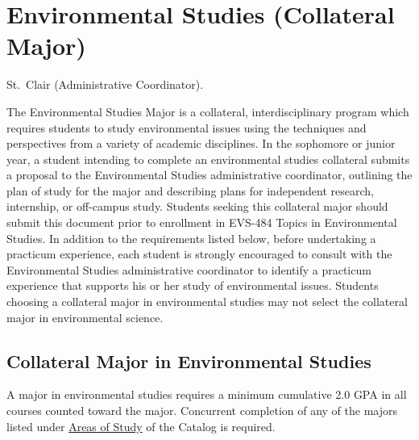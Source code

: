 \documentclass[
  letterpaper,
]{scrbook}
\begin{document}
\hypertarget{sec-environmental-studies}{%
\section{Environmental Studies (Collateral
Major)}\label{sec-environmental-studies}}

St.~Clair (Administrative Coordinator).

The Environmental Studies Major is a collateral, interdisciplinary
program which requires students to study environmental issues using the
techniques and perspectives from a variety of academic disciplines. In
the sophomore or junior year, a student intending to complete an
environmental studies collateral submits a proposal to the Environmental
Studies administrative coordinator, outlining the plan of study for the
major and describing plans for independent research, internship, or
off-campus study. Students seeking this collateral major should submit
this document prior to enrollment in EVS-484 Topics in Environmental
Studies. In addition to the requirements listed below, before
undertaking a practicum experience, each student is strongly encouraged
to consult with the Environmental Studies administrative coordinator to
identify a practicum experience that supports his or her study of
environmental issues. Students choosing a collateral major in
environmental studies may not select the collateral major in
environmental science.

\hypertarget{collateral-major-in-environmental-studies}{%
\subsection{Collateral Major in Environmental
Studies}\label{collateral-major-in-environmental-studies}}

A major in environmental studies requires a minimum cumulative 2.0 GPA
in all courses counted toward the major. Concurrent completion of any of
the majors listed under
\protect\hyperlink{Areasux5cux2520Ofux5cux2520Study}{Areas of Study} of
the Catalog is required.
\end{document}
